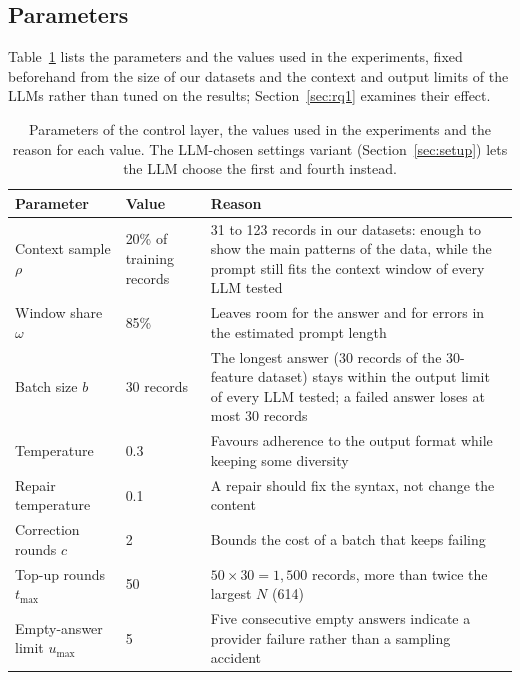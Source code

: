 \documentclass[conference]{IEEEtran}
\begin{document}
\subsection{Parameters}
Table~\ref{tab:params} lists the parameters and the values used in the experiments, fixed beforehand from the size of our datasets and the context and output limits of the LLMs rather than tuned on the results; Section~\ref{sec:rq1} examines their effect.

\begin{table}[t]
\centering
\caption{Parameters of the control layer, the values used in the experiments and the reason for each value. The LLM-chosen settings variant (Section~\ref{sec:setup}) lets the LLM choose the first and fourth instead.}
\label{tab:params}
\footnotesize
\setlength{\tabcolsep}{2pt}
\begin{tabular}{@{}p{}p{}p{}@{}}
\toprule
Parameter & Value & Reason \\
\midrule
Context sample $\rho$ & 20\% of training records & 31 to 123 records in our datasets: enough to show the main patterns of the data, while the prompt still fits the context window of every LLM tested \\
Window share $\omega$ & 85\% & Leaves room for the answer and for errors in the estimated prompt length \\
Batch size $b$ & 30 records & The longest answer (30 records of the 30-feature dataset) stays within the output limit of every LLM tested; a failed answer loses at most 30 records \\
Temperature & 0.3 & Favours adherence to the output format while keeping some diversity \\
Repair temperature & 0.1 & A repair should fix the syntax, not change the content \\
Correction rounds $c$ & 2 & Bounds the cost of a batch that keeps failing \\
Top-up rounds $t_{\max}$ & 50 & $50\times30=1{,}500$ records, more than twice the largest $N$ (614) \\
Empty-answer limit $u_{\max}$ & 5 & Five consecutive empty answers indicate a provider failure rather than a sampling accident \\
\bottomrule
\end{tabular}
\end{table}

\end{document}
